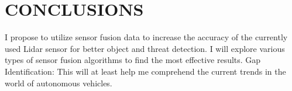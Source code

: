\documentclass[letterpaper, 10 pt, conference]{ieeeconf}  %
\begin{document}
\section{CONCLUSIONS}

I propose to utilize sensor fusion data to increase the accuracy of the currently used Lidar sensor for better object and threat detection. I will explore various types of sensor fusion algorithms to find the most effective results. 
Gap Identification: This will at least help me comprehend the current trends in the world of autonomous vehicles.

\addtolength{\textheight}{-12cm}   %










\end{document}
